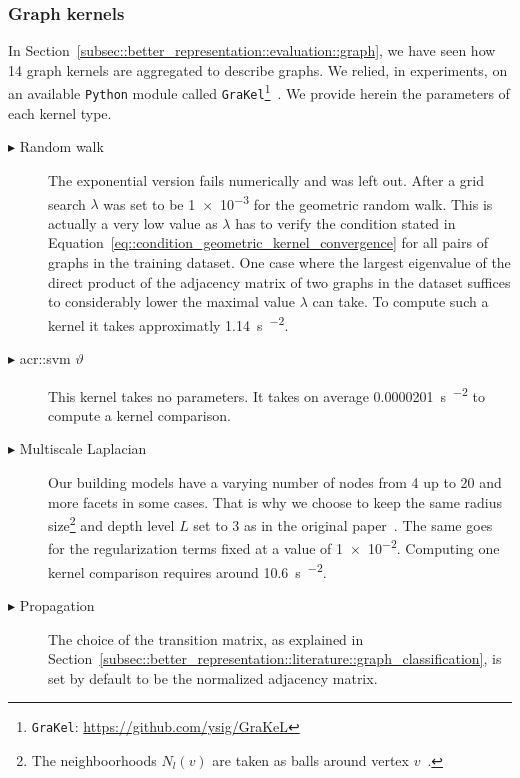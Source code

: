         \subsubsection{Graph kernels}
            In Section~\ref{subsec::better_representation::evaluation::graph}, we have seen how 14 graph kernels are aggregated to describe graphs.
            We relied, in experiments, on an available \verb!Python! module called \verb!GraKel!\footnote{\verb!GraKel!: \href{https://github.com/ysig/GraKeL}{\url{https://github.com/ysig/GraKeL}}}~\parencite{siglidis2018grakel}.
            We provide herein the parameters of each kernel type.
            \begin{description}
                \item[\(\blacktriangleright\) Random walk] The exponential version fails numerically and was left out.
                    After a grid search \(\lambda\) was set to be \num[scientific-notation = true]{1e-3} for the geometric random walk.
                    This is actually a very low value as \(\lambda\) has to verify the condition stated in Equation~\ref{eq::condition_geometric_kernel_convergence} for all pairs of graphs in the training dataset.
                    One case where the largest eigenvalue of the direct product of the adjacency matrix of two graphs in the dataset suffices to considerably lower the maximal value \(\lambda\) can take.
                    To compute such a kernel it takes approximatly \SI{1.14}{\s\per\building\squared}.
                \item[\(\blacktriangleright\) \gls{acr::svm} \(\vartheta\)] This kernel takes no parameters.
                    It takes on average \SI[scientific-notation = true]{0.0000201}{\s\per\building\squared} to compute a kernel comparison.
                \item[\(\blacktriangleright\) Multiscale Laplacian] Our building models have a varying number of nodes from 4 up to 20 and more facets in some cases.
                    That is why we choose to keep the same radius size\footnote{The neighboorhoods \(N_l(v)\) are taken as balls around vertex \(v\)~\parencite{kondor2016multiscale}.} and depth level \(L\) set to 3 as in the original paper~\parencite{kondor2016multiscale}.
                    The same goes for the regularization terms fixed at a value of \num[scientific-notation = true]{1e-2}.
                    Computing one kernel comparison requires around \SI{10.6}{\s\per\building\squared}.
                \item[\(\blacktriangleright\) Propagation] The choice of the transition matrix, as explained in Section~\ref{subsec::better_representation::literature::graph_classification}, is set by default to be the normalized adjacency matrix.

\end{description}
